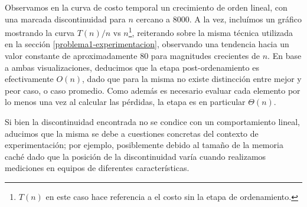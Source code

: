Observamos en la curva de costo temporal un crecimiento de orden lineal, con una marcada discontinuidad para $n$ cercano a $8000$. A la vez, incluímos un gráfico mostrando la curva $T(n) / n$ vs $n$\footnote{$T(n)$ en este caso hace referencia a el costo sin la etapa de ordenamiento.}, reiterando sobre la misma técnica utilizada en la sección \ref{problema1-experimentacion}, observando una tendencia hacia un valor constante de aproximadamente $80$ para magnitudes crecientes de $n$. En base a ambas visualizaciones, deducimos que la etapa post-ordenamiento es efectivamente $O(n)$, dado que para la misma no existe distincción entre mejor y peor caso, o caso promedio. Como además es necesario evaluar cada elemento por lo menos una vez al calcular las pérdidas, la etapa es en particular $\Theta(n)$.

Si bien la discontinuidad encontrada no se condice con un comportamiento lineal, aducimos que la misma se debe a cuestiones concretas del contexto de experimentación; por ejemplo, posiblemente debido al tamaño de la memoria caché dado que la posición de la discontinuidad varía cuando realizamos mediciones en equipos de diferentes características.


